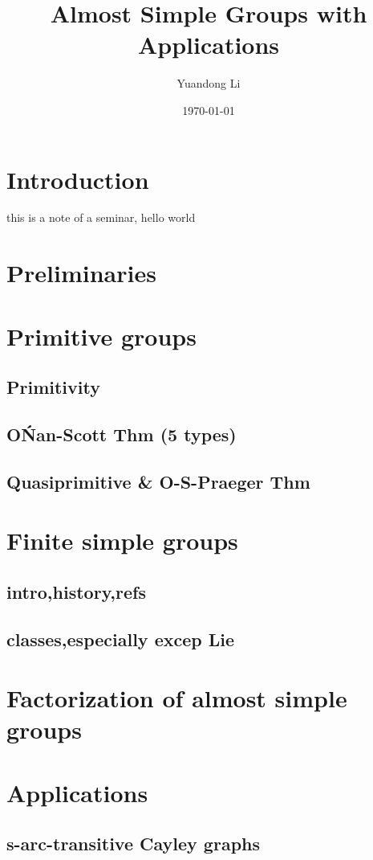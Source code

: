\documentclass[a4,11pt]{article}
\title{Almost Simple Groups with Applications}
\author{Yuandong Li}
\date{\today}
\begin{document}
\maketitle

\tableofcontents

\section{Introduction}
this is a note of a seminar, hello world


\section{Preliminaries}

\section{Primitive groups}
\subsection{Primitivity}
\subsection{O\'Nan-Scott Thm (5 types)}
\subsection{Quasiprimitive \& O-S-Praeger Thm}

\section{Finite simple groups}
\subsection{intro,history,refs}
\subsection{classes,especially excep Lie}

\section{Factorization of almost simple groups}

\section{Applications}
\subsection{s-arc-transitive Cayley graphs}
\end{document}
